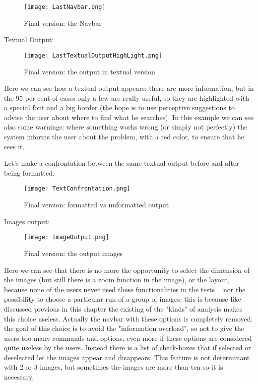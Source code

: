 \begin{figure}[H]
\centering
\texttt{[image: LastNavbar.png]} 
\caption{Final version: the Navbar}
\end{figure}  


Textual Output:

\begin{figure}[H]
\centering
\texttt{[image: LastTextualOutputHighLight.png]} 
\caption{Final version: the output in textual version}
\end{figure}  

Here we can see how a textual output appears: there are more information, but in the 95 per cent of cases only a few are really useful, so they are highlighted with a special font and a big border (the hope is to use perceptive suggestions to advise the user about where to find what he searches). In this example we can see also some warnings: where something works wrong (or simply not perfectly) the system informs the user about the problem, with a red color, to ensure that he sees it. 

Let's make a confrontation between the same textual output before and after being formatted:

\begin{figure}[H]
\centering
\texttt{[image: TextConfrontation.png]} 
\caption{Final version: formatted vs unformatted output}
\end{figure}  


Images output:

\begin{figure}[H]
\centering
\texttt{[image: ImageOutput.png]} 
\caption{Final version: the output images}
\end{figure}  

Here we can see that there is no more the opportunity to select the dimension of the images (but still there is a zoom function in the image), or the layout, because none of the users never used these functionalities in the tests .. nor the possibility to choose a particular run of a group of images: this is because like discussed previous in this chapter the existing of the "kinds" of analysis makes this choice useless. Actually the navbar with these options is completely removed: the goal of this choice is to avoid the "information overload", so not to give the users too many commands and options, even more if these options are considered quite useless by the users.
Instead there is a list of check-boxes that if selected or deselected let the images appear and disappears. This feature is not determinant with 2 or 3 images, but sometimes the images are more than ten so it is necessary.


